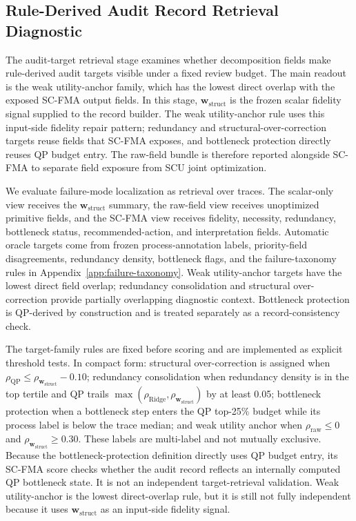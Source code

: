 \documentclass[a4paper,fleqn]{cas-sc}
\newcommand{\wstruct}{\ensuremath{\mathbf{w}_{\mathrm{struct}}}}
\begin{document}
\subsection{Rule-Derived Audit Record Retrieval Diagnostic}
\label{sec:why-calibration}
\label{sec:audit-results}
\label{sec:oracle-auto-validation}

The audit-target retrieval stage examines whether decomposition fields make rule-derived audit targets visible under a fixed review budget. The main readout is the weak utility-anchor family, which has the lowest direct overlap with the exposed SC-FMA output fields. In this stage, \wstruct{} is the frozen scalar fidelity signal supplied to the record builder. The weak utility-anchor rule uses this input-side fidelity repair pattern; redundancy and structural-over-correction targets reuse fields that SC-FMA exposes, and bottleneck protection directly reuses QP budget entry. The raw-field bundle is therefore reported alongside SC-FMA to separate field exposure from SCU joint optimization.

We evaluate failure-mode localization as retrieval over traces. The scalar-only view receives the \wstruct{} summary, the raw-field view receives unoptimized primitive fields, and the SC-FMA view receives fidelity, necessity, redundancy, bottleneck status, recommended-action, and interpretation fields. Automatic oracle targets come from frozen process-annotation labels, priority-field disagreements, redundancy density, bottleneck flags, and the failure-taxonomy rules in Appendix~\ref{app:failure-taxonomy}. Weak utility-anchor targets have the lowest direct field overlap; redundancy consolidation and structural over-correction provide partially overlapping diagnostic context. Bottleneck protection is QP-derived by construction and is treated separately as a record-consistency check.

The target-family rules are fixed before scoring and are implemented as explicit threshold tests. In compact form: structural over-correction is assigned when $\rho_{\mathrm{QP}}\le \rho_{\wstruct{}}-0.10$; redundancy consolidation when redundancy density is in the top tertile and QP trails $\max(\rho_{\mathrm{Ridge}},\rho_{\wstruct{}})$ by at least 0.05; bottleneck protection when a bottleneck step enters the QP top-25\% budget while its process label is below the trace median; and weak utility anchor when $\rho_{\mathrm{raw}}\le 0$ and $\rho_{\wstruct{}}\ge 0.30$. These labels are multi-label and not mutually exclusive. Because the bottleneck-protection definition directly uses QP budget entry, its SC-FMA score checks whether the audit record reflects an internally computed QP bottleneck state. It is not an independent target-retrieval validation. Weak utility-anchor is the lowest direct-overlap rule, but it is still not fully independent because it uses \wstruct{} as an input-side fidelity signal.
\end{document}
